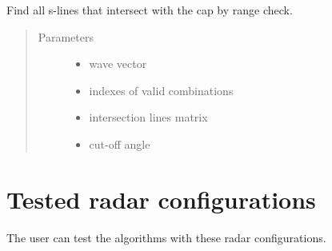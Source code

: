 \documentclass[letterpaper,10pt,english]{sphinxmanual}
\begin{document}
\begin{fulllineitems}
\label{\detokenize{functions:functions.slines_intersections}}
Find all s-lines that intersect with the cap by range check.
\begin{quote}\begin{description}
\item[{Parameters}] \leavevmode\begin{itemize}
\item {} 
 \textendash{} wave vector

\item {} 
 \textendash{} indexes of valid combinations

\item {} 
 \textendash{} intersection lines matrix

\item {} 
 \textendash{} cut-off angle

\end{itemize}

\end{description}\end{quote}

\end{fulllineitems}



\chapter{Tested radar configurations}
\label{\detokenize{radarconf:tested-radar-configurations}}\label{\detokenize{radarconf::doc}}
The user can test the algorithms with these radar configurations.

\label{\detokenize{radarconf:module-radarconf}}
\end{document}
